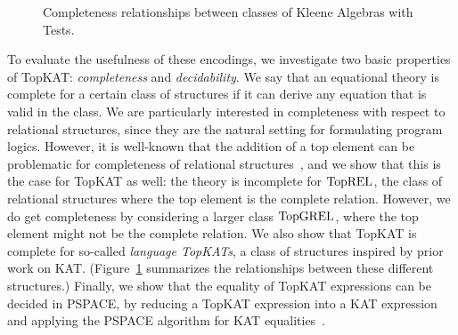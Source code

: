 
\begin{figure}
    \centering
    \caption{Completeness relationships between classes of Kleene Algebras with Tests.}\label{fig:completeness}
\end{figure}

To evaluate the usefulness of these encodings, we investigate two basic
properties of TopKAT\@: \emph{completeness} and \emph{decidability}.  We say
that an equational theory is complete for a certain class of structures if it
can derive any equation that is valid in the class.  We are particularly
interested in completeness with respect to relational structures, since they are
the natural setting for formulating program logics. However, it is well-known that the
addition of a top element can be problematic for completeness of relational 
structures~\cite{pousAutomataRelationAlgebra2016}, 
and we show that this is the case for TopKAT as well: the theory is incomplete for
\(\mathbf{\mathrm{TopREL}}\), the class of relational structures where the top element is the
complete relation.  However, we do get completeness by considering a larger
class \(\mathbf{\mathrm{TopGREL}}\), where the top element might not be the complete relation.
We also show that TopKAT is complete for so-called \emph{language TopKATs}, a
class of structures inspired by prior work on KAT\@.
(Figure~\ref{fig:completeness} summarizes the relationships between these
different structures.)  Finally, we show that the equality of TopKAT expressions can
be decided in PSPACE, by reducing a TopKAT expression into a KAT expression and 
applying the PSPACE algorithm for KAT equalities~\cite{Cohen_Kozen_Smith_1999}.

